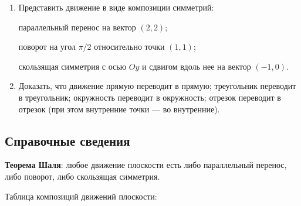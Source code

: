 \begin{enumerate}
\item Представить движение в виде композиции симметрий:

\noindent\ipunkt параллельный перенос на вектор $(2,2)$;

\noindent\ipunkt поворот на угол $\pi/2$ относительно точки $(1,1)$;

\noindent\ipunkt скользящая симметрия с осью $Oy$ и сдвигом вдоль нее на вектор $(-1,0)$.

\item Доказать, что движение \ipunkt прямую переводит в прямую; \ipunkt треугольник переводит в треугольник; \ipunkt окружность переводит в окружность; \ipunkt отрезок переводит в отрезок (при этом внутренние точки --- во внутренние).
\end{enumerate}

\subsection*{Справочные сведения}

\textbf{Теорема Шаля}: любое движение плоскости есть либо параллельный перенос, либо поворот, либо скользящая симметрия.

Таблица композиций движений плоскости:

